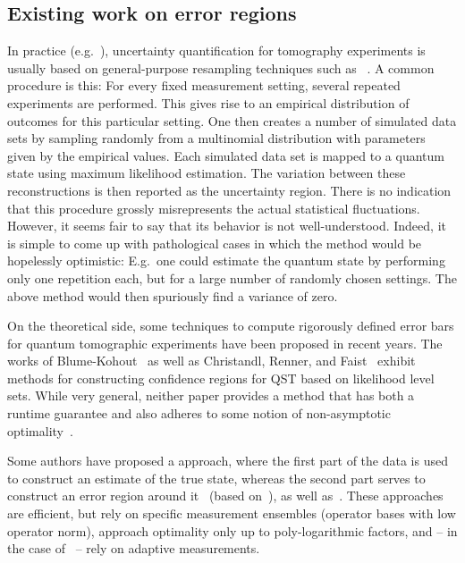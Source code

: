 \subsection{Existing work on error regions}
In practice (e.g.~\cite{Haeffner_2005_Scalable}), uncertainty quantification for tomography experiments is usually based on general-purpose resampling techniques such as ~\cite{Efron_1994_Introduction}.
A common procedure is this: For every fixed measurement setting, several repeated experiments are performed.
This gives rise to an empirical distribution of outcomes for this particular setting.
One then creates a number of simulated data sets by sampling randomly from a multinomial distribution with parameters given by the empirical values.
Each simulated data set is mapped to a quantum state using maximum likelihood estimation.
The variation between these reconstructions is then reported as the uncertainty region.
There is no indication that this procedure grossly misrepresents the actual statistical fluctuations.
However, it seems fair to say that its behavior is not well-understood.
Indeed, it is simple to come up with pathological cases in which the method would be hopelessly optimistic:
E.g.\ one could estimate the quantum state by performing only one repetition each, but for a large number of randomly chosen settings.
The above method would then spuriously find a variance of zero.

On the theoretical side, some techniques to compute rigorously defined error bars for quantum tomographic experiments have been proposed in recent years.
The works of Blume-Kohout~\cite{Kohout_2012_Robust} as well as Christandl, Renner, and Faist~\cite{Christandl_2012_Reliable,Faist_2015_Practical} exhibit methods for constructing confidence regions for QST based on likelihood level sets.
While very general, neither paper provides a method that has both a runtime guarantee and also adheres to some notion of non-asymptotic optimality~\cite{Kiefer_2012_Introduction,Cam_2012_Asymptotic}.

Some  authors have proposed a  approach, where the first part of the data is used to construct an estimate of the true state, whereas the second part serves to construct an error region around it~\cite{Flammia_2012_Quantum} (based on~\cite{Flammia_2011_Direct}), as well as~\cite{Carpentier_2015_Uncertainty}.
These approaches are efficient, but rely on specific measurement ensembles (operator bases with low operator norm), approach optimality only up to poly-logarithmic factors, and -- in the case of~\cite{Flammia_2012_Quantum, Flammia_2011_Direct} -- rely on adaptive measurements.

